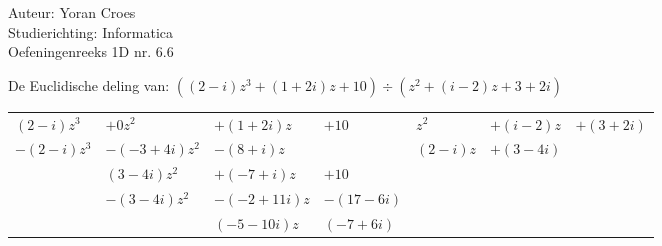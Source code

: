 \documentclass[a4paper]{article}
\begin{document}
\noindent \large Auteur: Yoran Croes \\
\noindent \large Studierichting: Informatica\\
\noindent \large Oefeningenreeks 1D nr. 6.6\\

\medskip

\normalsize

De Euclidische deling van: $((2-i)z^3 + (1 +2i)z + 10) \div (z^2 + (i -2)z + 3 + 2i)$\\

\begin{tabular}{llll|lll}
$(2-i)z^3$                & $+0z^2$        & $+(1+2i)z$   & $+10$      & $z^2$    & $+(i-2)z$ & $+(3+2i)$ \\ \cline{5-7}
$-(2-i)z^3$               & $-(-3+4i)z^2$ & $-(8+i)z$    &            & $(2-i)z$ & $+(3-4i)$ & \\ \cline{1-3}
                          & $(3-4i)z^2$   & $+(-7+i)z$    & $+10$      &          &           & \\
                          & $-(3-4i)z^2$  & $-(-2+11i)z$ & $-(17-6i)$ &          &           & \\ \cline{2-4}
                          &               & $(-5-10i)z$  & $(-7+6i)$  &          &           & \\
\end{tabular}

\begin{thebibliography}{999}
\end{thebibliography}
\end{document}
